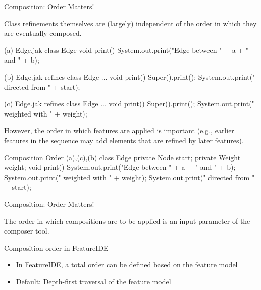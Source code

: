 \begin{frame}[fragile]{Composition: Order Matters!}
	\begin{note}{}
		Class refinements themselves are (largely) independent of the order in which they are eventually composed.
	\end{note}
	\begin{mycolumns}[widths={50,50},animation=none]
{
\begin{codetight}[basicstyle=\tiny]{(a) Edge.jak}
class Edge {
	void print() {
		System.out.print("Edge between " + a + " and " + b);
	}
}
\end{codetight}
\begin{codetight}[basicstyle=\tiny]{(b) Edge.jak}
refines class Edge { ...
	void print() {
		Super().print();
		System.out.print(" directed from " + start);
	}
}
\end{codetight}
\begin{codetight}[basicstyle=\tiny]{(c) Edge.jak}
refines class Edge { ...
	void print() {
		Super().print();
		System.out.print(" weighted with " + weight);
	}
}
\end{codetight}
}
	\mynextcolumn
		\begin{note}{}
			However, the order in which features are applied is important 
			(e.g., earlier features in the sequence may add elements that are refined by later features). 
		\end{note}
\begin{codetight}{Composition Order (a),(c),(b)}
class Edge {
	private Node start;
	private Weight weight;
	void print() {
		System.out.print("Edge between " + a + " and " + b);
		System.out.print(" weighted with " + weight);
		System.out.print(" directed from " + start);
	}
}
\end{codetight}
	\end{mycolumns}
\end{frame}

\begin{frame}{Composition: Order Matters!}
	\begin{mycolumns}[widths={50,50},animation=none]
		\begin{note}{}
			The order in which compositions are to be applied is an input parameter of the composer tool.
		\end{note}
		\pause
		\begin{note}{Composition order in FeatureIDE}
			\begin{itemize}
				\item In FeatureIDE, a total order can be defined based on the feature model
				\item Default: Depth-first traversal of the feature model
			\end{itemize}
		\end{note}
	\mynextcolumn
		\begin{exampletight}{}
			\centering\featureDiagramGraphs
			\featureDiagramLegend
		\end{exampletight}
	\end{mycolumns}
\end{frame}

